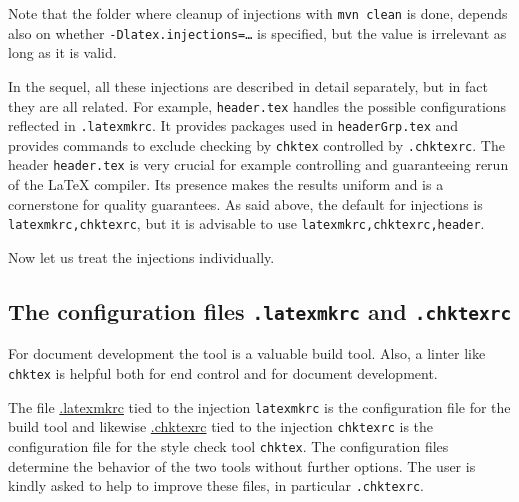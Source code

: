 Note that the folder where cleanup of injections with \texttt{mvn clean} is done, 
depends also on whether \texttt{-Dlatex.injections=\dots} is specified, 
but the value is irrelevant as long as it is valid. 

In the sequel, all these injections are described in detail separately, 
but in fact they are all related. 
For example, \texttt{header.tex} handles the possible configurations 
reflected in \texttt{.latexmkrc}. 
It provides packages used in \texttt{headerGrp.tex} 
and provides commands to exclude checking by \texttt{chktex} 
controlled by \texttt{.chktexrc}. 
The header \texttt{header.tex} is very crucial 
for example controlling and guaranteeing rerun of the \LaTeX{} compiler. 
Its presence makes the results uniform and is a cornerstone for quality guarantees. 
As said above, the default for injections is \texttt{latexmkrc,chktexrc}, 
but it is advisable to use \texttt{latexmkrc,chktexrc,header}. 





Now let us treat the injections individually. 



\subsection{The configuration files \texttt{.latexmkrc} and \texttt{.chktexrc}}\label{subsec:latChkRc}

For document development the tool  is a valuable build tool. 
Also, a linter like \texttt{chktex} is helpful 
both for end control and for document development. 

The file \href{\urlSite fromTex/.latexmkrc}{.latexmkrc} tied to the injection \texttt{latexmkrc} 
is the configuration file for the build tool  
and likewise \href{\urlSite fromTex/.chktexrc}{.chktexrc} tied to the injection \texttt{chktexrc} 
is the configuration file for the style check tool \texttt{chktex}. 
The configuration files determine the behavior of the two tools without further options. 
The user is kindly asked to help to improve these files, in particular \texttt{.chktexrc}. 

